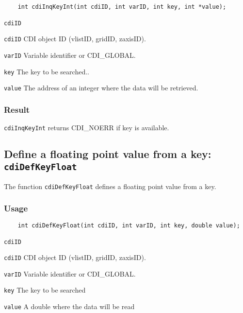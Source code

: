 \begin{verbatim}
    int cdiInqKeyInt(int cdiID, int varID, int key, int *value);
\end{verbatim}

\hspace*{4mm}\begin{minipage}[]{15cm}
\begin{deflist}{\texttt{cdiID}\ }
\item[\texttt{cdiID}]
CDI object ID (vlistID, gridID, zaxisID).
\item[\texttt{varID}]
Variable identifier or CDI\_GLOBAL.
\item[\texttt{key}]
The key to be searched..
\item[\texttt{value}]
The address of an integer where the data will be retrieved.

\end{deflist}
\end{minipage}

\subsubsection*{Result}

{\texttt{cdiInqKeyInt}} returns CDI\_NOERR if key is available.



\subsection{Define a floating point value from a key: \texttt{cdiDefKeyFloat}}
\label{cdiDefKeyFloat}

The function {\texttt{cdiDefKeyFloat}} defines a {\CDI} floating point value from a key.

\subsubsection*{Usage}

\begin{verbatim}
    int cdiDefKeyFloat(int cdiID, int varID, int key, double value);
\end{verbatim}

\hspace*{4mm}\begin{minipage}[]{15cm}
\begin{deflist}{\texttt{cdiID}\ }
\item[\texttt{cdiID}]
CDI object ID (vlistID, gridID, zaxisID).
\item[\texttt{varID}]
Variable identifier or CDI\_GLOBAL.
\item[\texttt{key}]
The key to be searched
\item[\texttt{value}]
A double where the data will be read

\end{deflist}
\end{minipage}

